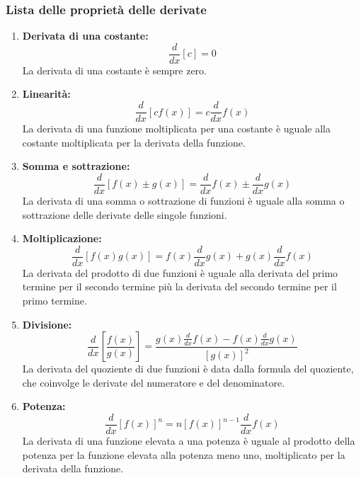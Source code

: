 \documentclass{article}
\begin{document}
\subsubsection{Lista delle proprietà delle derivate}
\begin{enumerate}
    \item \textbf{Derivata di una costante:}
    \begin{equation*}
        \frac{d}{dx} [c] = 0
    \end{equation*}
    La derivata di una costante è sempre zero.
    
    \item \textbf{Linearità:}
    \begin{equation*}
        \frac{d}{dx} [cf(x)] = c \frac{d}{dx} f(x)
    \end{equation*}
    La derivata di una funzione moltiplicata per una costante è uguale alla costante moltiplicata per la derivata della funzione.
    
    \item \textbf{Somma e sottrazione:}
    \begin{equation*}
        \frac{d}{dx} [f(x) \pm g(x)] = \frac{d}{dx} f(x) \pm \frac{d}{dx} g(x)
    \end{equation*}
    La derivata di una somma o sottrazione di funzioni è uguale alla somma o sottrazione delle derivate delle singole funzioni.
    
    \item \textbf{Moltiplicazione:}
    \begin{equation*}
        \frac{d}{dx} [f(x) g(x)] = f(x) \frac{d}{dx} g(x) + g(x) \frac{d}{dx} f(x)
    \end{equation*}
    La derivata del prodotto di due funzioni è uguale alla derivata del primo termine per il secondo termine più la derivata del secondo termine per il primo termine.
    
    \item \textbf{Divisione:}
    \begin{equation*}
        \frac{d}{dx} \left[ \frac{f(x)}{g(x)} \right] = \frac{g(x) \frac{d}{dx} f(x) - f(x) \frac{d}{dx} g(x)}{[g(x)]^2}
    \end{equation*}
    La derivata del quoziente di due funzioni è data dalla formula del quoziente, che coinvolge le derivate del numeratore e del denominatore.
    
    \item \textbf{Potenza:}
    \begin{equation*}
        \frac{d}{dx} [f(x)]^n = n [f(x)]^{n-1} \frac{d}{dx} f(x)
    \end{equation*}
    La derivata di una funzione elevata a una potenza è uguale al prodotto della potenza per la funzione elevata alla potenza meno uno, moltiplicato per la derivata della funzione.
    

\end{enumerate}
\end{document}
